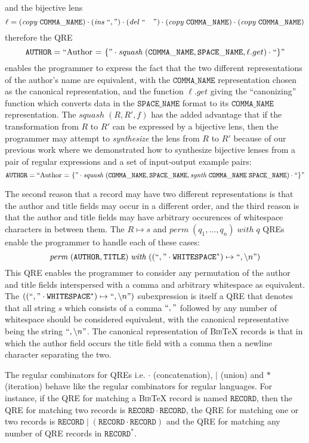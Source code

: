 \documentclass{svproc}
\newcommand{\re}[1]{\ensuremath{\mathtt{#1}}}
\newcommand{\squash}[3]{\ensuremath{\mathit{squash} \; (#1, #2, #3)}}
\newcommand{\perm}[2]{\ensuremath{\mathit{perm}\; (#1)\; \mathit{with}\; #2}}
\newcommand{\sep}{\ensuremath{\; | \;}}
\newcommand{\bibtex}{\textsc{Bib}\TeX{}}
\begin{document}
and the bijective lens 
$$ \ell = (\mathit{copy} \; \mathtt{COMMA\_NAME}) \cdot (\mathit{ins} \; ``,")
\cdot (\mathit{del} \; `` \quad") \cdot (\mathit{copy} \; \mathtt{COMMA\_NAME})
\cdot (\mathit{copy} \; \mathtt{COMMA\_NAME})$$
therefore the QRE
$$\mathtt{AUTHOR}
=
``\text{Author
  = \{}" \cdot \squash{\mathtt{COMMA\_NAME}}{\mathtt{SPACE\_NAME}}{\ell.get}
\cdot ``\}"$$ enables the programmer to express the fact that the two different
representations of the author's name are equivalent, with the
$\mathtt{COMMA\_NAME}$ representation chosen as the canonical representation,
and the function $\ell.get$ giving the ``canonizing'' function which converts
data in the $\mathtt{SPACE\_NAME}$ format to its $\mathtt{COMMA\_NAME}$
representation. The $\squash{R}{R'}{f}$ has the added advantage that if the
transformation from $R$ to $R'$ can be expressed by a bijective lens,
then the programmer may attempt to \textit{synthesize} the lens from $R$ to $R'$
because of our previous work where we demonstrated how to synthesize bijective
lenses from a pair of regular expressions and a set of input-output example
pairs:
$$\mathtt{AUTHOR}
=
``\text{Author
  = \{}" \cdot \squash{\mathtt{COMMA\_NAME}}{\mathtt{SPACE\_NAME}}{\mathit{synth}
  \; \mathtt{COMMA\_NAME} \; \mathtt{SPACE\_NAME}} \cdot ``\}"$$

The second reason that a record may have two different representations is that
the author and title fields may occur in a different order, and the third
reason is that the author and title fields may have arbitrary occurences of
whitespace characters in between them. The $R \mapsto s$ and $\perm{q_1,
  \ldots, q_n}{q}$ QREs enable the programmer to handle each of these cases:
$$\perm{\re{AUTHOR}, \re{TITLE}}{((``," \cdot \re{WHITESPACE}^*) \mapsto \string
  ``, \backslash n")}$$
This QRE enables the programmer to consider any permutation of the author and
title fields interspersed with a comma and arbitrary whitespace as equivalent.
The $((``," \cdot \re{WHITESPACE}^*) \mapsto \string ``, \backslash n")$
subexpression is itself a QRE that denotes that all string $s$ which consists
of a comma $``,"$ followed by any number of whitespace should be considered
equivalent, with the canonical representative being the string $\string ``,
\backslash n"$. The canonical representation of \bibtex{} records is that in
which the author field occurs the title field with a comma then a newline
character separating the two.

The regular combinators for QREs i.e. $\cdot$ (concatenation), $|$ (union) and
$*$ (iteration) behave like the regular combinators for regular languages. For
instance, if the QRE for matching a \bibtex{} \; record is named
$\mathtt{RECORD}$, then the QRE for matching two records is $\mathtt{RECORD}
\cdot \mathtt{RECORD}$, the QRE for matching one or two records is $\mathtt{RECORD}
\sep (\mathtt{RECORD} \cdot \mathtt{RECORD})$ and the QRE for matching any
number of QRE records in $\mathtt{RECORD}^*$.
\end{document}
